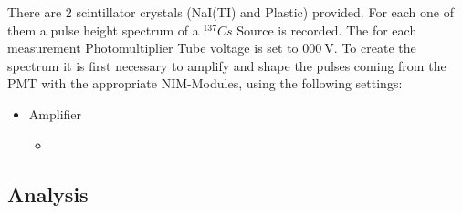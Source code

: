 \documentclass[12pt,twoside,a4paper]{scrartcl}
\begin{document}
	There are 2 scintillator crystals (NaI(TI) and Plastic) provided. For each one of them a pulse height spectrum of a $^{137}Cs$ Source is recorded. The for each measurement Photomultiplier Tube voltage is set to $\SI{000}{\volt}$. To create the spectrum it is first necessary to amplify and shape the pulses coming from the PMT with the appropriate NIM-Modules, using the following settings:

	\begin{itemize}
		\item Amplifier
			\begin{itemize}
				\item
			\end{itemize}
	\end{itemize}

	\subsection{Analysis}
\end{document}
